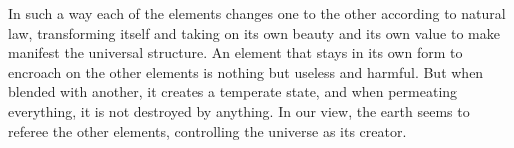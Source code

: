 In such a way each of the elements changes one to the other according to natural law, transforming itself and taking on its own beauty and its own value to make manifest the universal structure. An element that stays in its own form to encroach on the other elements is nothing but useless and harmful. But when blended with another, it creates a temperate state, and when permeating everything, it is not destroyed by anything. In our view, the earth seems to referee the other elements, controlling the universe as its creator.

\newpage